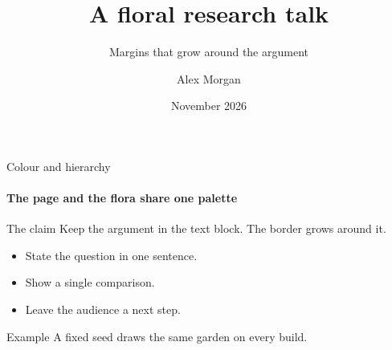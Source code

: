 \documentclass[aspectratio=169]{beamer}
\title{A floral research talk}
\subtitle{Margins that grow around the argument}
\author{Alex Morgan}
\institute{Example University}
\date{November 2026}
\begin{document}
\begin{frame}[plain]
  \titlepage
\end{frame}
\begin{frame}{Colour and hierarchy}
  \framesubtitle{The page and the flora share one palette}
  \begin{block}{The claim}
    Keep the argument in the text block. The border grows around it.
  \end{block}
  \begin{itemize}
    \item State the question in one sentence.
    \item Show a single comparison.
    \item Leave the audience a next step.
  \end{itemize}
  \begin{exampleblock}{Example}
    A fixed seed draws the same garden on every build.
  \end{exampleblock}
\end{frame}
\end{document}
